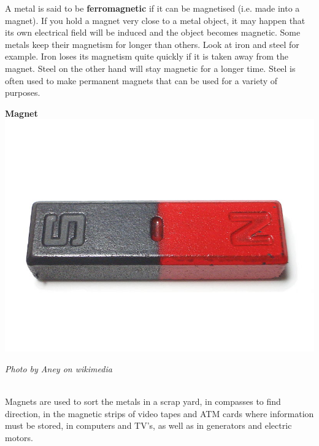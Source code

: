 \begin{minipage}{.5\textwidth}
      \label{m38706*id67186}A metal is said to be \textbf{ferromagnetic} if it can be magnetised (i.e. made into a magnet). If you hold a magnet very close to a metal object, it may happen that its own electrical field will be induced and the object becomes magnetic. Some metals keep their magnetism for longer than others. Look at iron and steel for example. Iron loses its magnetism quite quickly if it is taken away from the magnet. Steel on the other hand will stay magnetic for a longer time. Steel is often used to make permanent magnets that can be used for a variety of purposes.\par 
\end{minipage}
\begin{minipage}{.5\textwidth}
\begin{center}
\textbf{Magnet}\\
 \includegraphics[width=.8\textwidth]{photos/magnet.jpg}\par
\textit{Photo by Aney on wikimedia}
\end{center}
\end{minipage}\\ \newline
      \label{m38706*id67200}Magnets are used to sort the metals in a scrap yard, in compasses to find direction, in the magnetic strips of video tapes and ATM cards where information must be stored, in computers and TV's, as well as in generators and electric motors.\par 
\label{m38706*secfhsst!!!underscore!!!id575}
